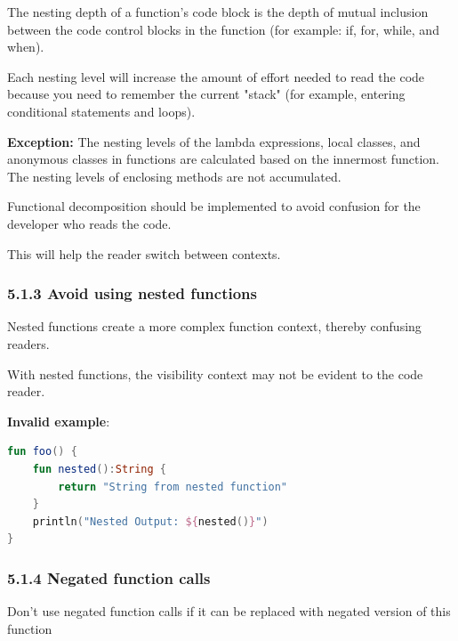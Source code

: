 \label{sec:5.1.2}



The nesting depth of a function's code block is the depth of mutual inclusion between the code control blocks in the function (for example: if, for, while, and when).

Each nesting level will increase the amount of effort needed to read the code because you need to remember the current "stack" (for example, entering conditional statements and loops). 

\textbf{Exception:} The nesting levels of the lambda expressions, local classes, and anonymous classes in functions are calculated based on the innermost function. The nesting levels of enclosing methods are not accumulated.

Functional decomposition should be implemented to avoid confusion for the developer who reads the code.

This will help the reader switch between contexts.



\subsubsection*{\textbf{5.1.3 Avoid using nested functions}}
\leavevmode\newline

\label{sec:5.1.3}

Nested functions create a more complex function context, thereby confusing readers.

With nested functions, the visibility context may not be evident to the code reader.



\textbf{Invalid example}:

\begin{lstlisting}[language=Kotlin]
fun foo() { 
    fun nested():String { 
        return "String from nested function" 
    } 
    println("Nested Output: ${nested()}") 
} 
\end{lstlisting}
\subsubsection*{\textbf{5.1.4 Negated function calls}}
\leavevmode\newline

\label{sec:5.1.4}

Don't use negated function calls if it can be replaced with negated version of this function



